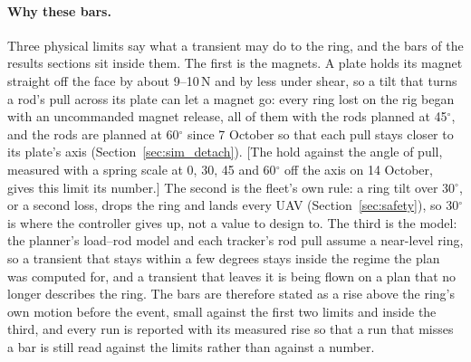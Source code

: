 \paragraph{Why these bars.} Three physical limits say what a transient may do to the ring, and the bars of the
results sections sit inside them. The first is the magnets. A plate holds its magnet straight off the face by
about 9--10\,N and by less under shear, so a tilt that turns a rod's pull across its plate can let a magnet go:
every ring lost on the rig began with an uncommanded magnet release, all of them with the rods planned at
45$^\circ$, and the rods are planned at 60$^\circ$ since 7 October so that each pull stays closer to its plate's
axis (Section~\ref{sec:sim_detach}). [The hold against the angle of pull, measured with a spring scale at 0, 30,
45 and 60$^\circ$ off the axis on 14 October, gives this limit its number.] The second is the fleet's own rule:
a ring tilt over 30$^\circ$, or a second loss, drops the ring and lands every UAV (Section~\ref{sec:safety}), so
30$^\circ$ is where the controller gives up, not a value to design to. The third is the model: the planner's
load--rod model and each tracker's rod pull assume a near-level ring, so a transient that stays within a few
degrees stays inside the regime the plan was computed for, and a transient that leaves it is being flown on a
plan that no longer describes the ring. The bars are therefore stated as a rise above the ring's own motion
before the event, small against the first two limits and inside the third, and every run is reported with its
measured rise so that a run that misses a bar is still read against the limits rather than against a number.
